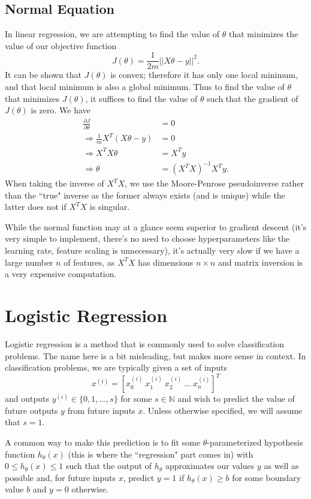 \documentclass{article}
\begin{document}
\subsection{Normal Equation}
In linear regression, we are attempting to find the value of $\theta$ that minimizes the value of our objective function
$$J(\theta) = \frac{1}{2m}||X\theta - y||^2.$$
It can be shown that $J(\theta)$ is convex; therefore it has only one local minimum, and that local minimum is also a global minimum. Thus to find the value of $\theta$ that minimizes $J(\theta)$, it suffices to find the value of $\theta$ such that the gradient of $J(\theta)$ is zero. We have
\begin{align*}
\frac{\partial J}{\partial \theta} &= 0\\
\Rightarrow \frac{1}{m} X^T(X\theta - y) &= 0\\
\Rightarrow X^TX\theta &= X^Ty\\
\Rightarrow \theta &= (X^TX)^{-1}X^Ty.
\end{align*}
When taking the inverse of $X^TX$, we use the Moore-Penrose pseudoinverse rather than the ``true" inverse as the former always exists (and is unique) while the latter does not if $X^TX$ is singular.

While the normal function may at a glance seem superior to gradient descent (it's very simple to implement, there's no need to choose hyperparameters like the learning rate, feature scaling is unnecessary), it's actually very slow if we have a large number $n$ of features, as $X^TX$ has dimensions $n \times n$ and matrix inversion is a very expensive computation.

\section{Logistic Regression}
Logistic regression is a method that is commonly used to solve classification problems. The name here is a bit misleading, but makes more sense in context. In classification problems, we are typically given a set of inputs
$$x^{(i)} = \left[x_0^{(i)}\ x_1^{(i)}\ x_2^{(i)}\ \dots \ x_n^{(i)}\right]^T$$
and outputs $y^{(i)} \in \{0, 1, \dots, s\}$ for some $s \in \mathbb{N}$ and wish to predict the value of future outputs $y$ from future inputs $x$. Unless otherwise specified, we will assume that $s = 1$. 

A common way to make this prediction is to fit some $\theta$-parameterized hypothesis function $h_\theta(x)$ (this is where the ``regression" part comes in) with $0 \le h_\theta(x) \le 1$ such that the output of $h_\theta$ approximates our values $y$ as well as possible and, for future inputs $x$, predict $y = 1$ if $h_\theta(x) \ge b$ for some boundary value $b$ and $y=0$ otherwise.
\end{document}
